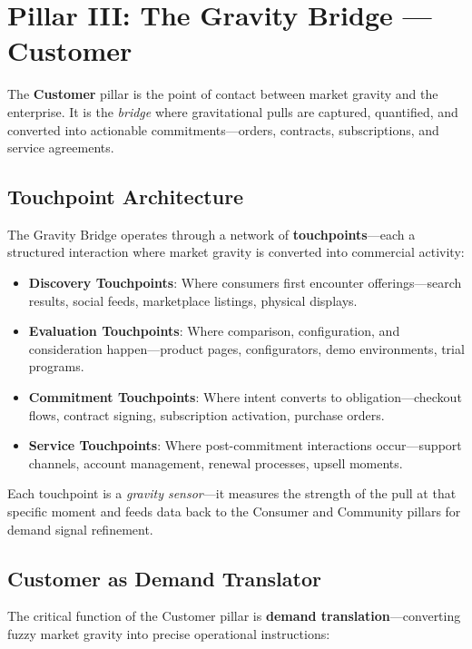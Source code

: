 \documentclass[11pt,a4paper,twocolumn]{article}
\begin{document}
\section{Pillar III: The Gravity Bridge --- Customer}
\label{sec:gravity-bridge}

The \textbf{Customer} pillar is the point of contact between market gravity and the enterprise. It is the \textit{bridge} where gravitational pulls are captured, quantified, and converted into actionable commitments---orders, contracts, subscriptions, and service agreements.

\subsection{Touchpoint Architecture}

The Gravity Bridge operates through a network of \textbf{touchpoints}---each a structured interaction where market gravity is converted into commercial activity:

\begin{itemize}[leftmargin=1.5em]
  \item \textbf{Discovery Touchpoints}: Where consumers first encounter offerings---search results, social feeds, marketplace listings, physical displays.
  \item \textbf{Evaluation Touchpoints}: Where comparison, configuration, and consideration happen---product pages, configurators, demo environments, trial programs.
  \item \textbf{Commitment Touchpoints}: Where intent converts to obligation---checkout flows, contract signing, subscription activation, purchase orders.
  \item \textbf{Service Touchpoints}: Where post-commitment interactions occur---support channels, account management, renewal processes, upsell moments.
\end{itemize}

Each touchpoint is a \textit{gravity sensor}---it measures the strength of the pull at that specific moment and feeds data back to the Consumer and Community pillars for demand signal refinement.

\subsection{Customer as Demand Translator}

The critical function of the Customer pillar is \textbf{demand translation}---converting fuzzy market gravity into precise operational instructions:
\end{document}
